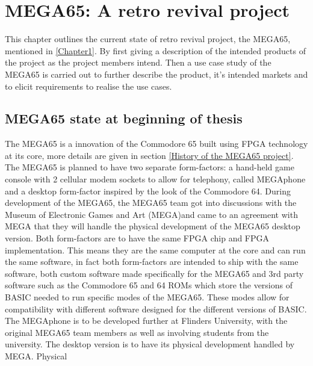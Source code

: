
\chapter{MEGA65: A retro revival project}
\label{Chapter4}

This chapter outlines the current state of retro revival project, the MEGA65, mentioned in \ref{Chapter1}. By first giving a description of the intended products of the project as the project members intend. Then a use case study of the MEGA65 is carried out to further describe the product, it's intended markets and to elicit requirements to realise the use cases. 
\section{MEGA65 state at beginning of thesis}
The MEGA65 is a innovation of the Commodore 65 built using FPGA technology at its core, more details are given in section \ref{History of the MEGA65 project}. The MEGA65 is planned to have two separate form-factors: a hand-held game console with 2 cellular modem sockets to allow for telephony, called MEGAphone and a desktop form-factor inspired by the look of the Commodore 64. During development of the MEGA65, the MEGA65 team got into discussions with the Museum of Electronic Games and Art (MEGA)and came to an agreement with MEGA that they will handle the physical development of the MEGA65 desktop version. Both form-factors are to have the same FPGA chip and FPGA implementation. This means they are the same computer at the core and can run the same software, in fact both form-factors are intended to ship with the same software, both custom software made specifically for the MEGA65 and 3rd party software such as the Commodore 65 and 64 ROMs which store the versions of BASIC needed to run specific modes of the MEGA65. These modes allow for compatibility with different software designed for the different versions of BASIC. The MEGAphone is to be developed further at Flinders University, with the original MEGA65 team members as well as involving students from the university. The desktop version is to have its physical development handled by MEGA. Physical 
